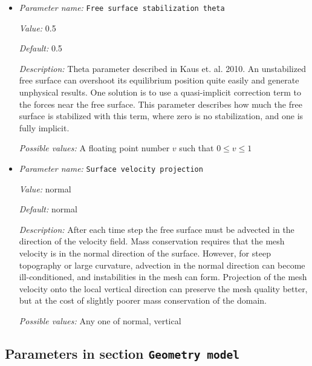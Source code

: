 \begin{itemize}
{\it Possible values:} A list of 0 to 4294967295 elements where each element is [Any string]
\item {\it Parameter name:} {\tt Free surface stabilization theta}
\label{parameters:Free surface/Free surface stabilization theta}


{\it Value:} 0.5


{\it Default:} 0.5


{\it Description:} Theta parameter described in Kaus et. al. 2010. An unstabilized free surface can overshoot its equilibrium position quite easily and generate unphysical results.  One solution is to use a quasi-implicit correction term to the forces near the free surface.  This parameter describes how much the free surface is stabilized with this term, where zero is no stabilization, and one is fully implicit.


{\it Possible values:} A floating point number $v$ such that $0 \leq v \leq 1$
\item {\it Parameter name:} {\tt Surface velocity projection}
\label{parameters:Free surface/Surface velocity projection}


{\it Value:} normal


{\it Default:} normal


{\it Description:} After each time step the free surface must be advected in the direction of the velocity field. Mass conservation requires that the mesh velocity is in the normal direction of the surface. However, for steep topography or large curvature, advection in the normal direction can become ill-conditioned, and instabilities in the mesh can form. Projection of the mesh velocity onto the local vertical direction can preserve the mesh quality better, but at the cost of slightly poorer mass conservation of the domain.


{\it Possible values:} Any one of normal, vertical
\end{itemize}

\subsection{Parameters in section \tt Geometry model}
\label{parameters:Geometry_20model}

